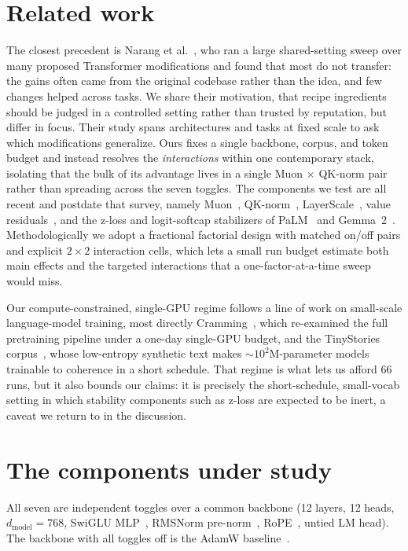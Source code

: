 \documentclass[11pt]{article}
\begin{document}
\section{Related work}

The closest precedent is Narang et al.~\cite{narang2021transfer}, who ran a
large shared-setting sweep over many proposed Transformer modifications and found
that most do not transfer: the gains often came from the original codebase rather
than the idea, and few changes helped across tasks. We share their motivation,
that recipe ingredients should be judged in a controlled setting rather than
trusted by reputation, but differ in focus. Their study spans architectures and
tasks at fixed scale to ask which modifications generalize. Ours fixes a single
backbone, corpus, and token budget and instead resolves the \emph{interactions}
within one contemporary stack, isolating that the bulk of its advantage lives in
a single Muon $\times$ QK-norm pair rather than spreading across the seven
toggles. The components we test are all recent and postdate that survey, namely
Muon~\cite{jordan2024muon}, QK-norm~\cite{henry2020qknorm},
LayerScale~\cite{touvron2021cait}, value residuals~\cite{zhou2024resformer}, and
the z-loss and logit-softcap stabilizers of PaLM~\cite{chowdhery2023palm} and
Gemma~2~\cite{gemma2}. Methodologically we adopt a fractional factorial design with matched
on/off pairs and explicit $2\times2$ interaction cells, which lets a small run
budget estimate both main effects and the targeted interactions that a
one-factor-at-a-time sweep would miss.

Our compute-constrained, single-GPU regime follows a line of work on small-scale
language-model training, most directly Cramming~\cite{geiping2023cramming}, which
re-examined the full pretraining pipeline under a one-day single-GPU budget, and
the TinyStories corpus~\cite{eldan2023tinystories}, whose low-entropy synthetic
text makes ${\sim}10^2$M-parameter models trainable to coherence in a short
schedule. That regime is what lets us afford 66 runs, but it also bounds our
claims: it is precisely the short-schedule, small-vocab setting in which
stability components such as z-loss are expected to be inert, a caveat we return
to in the discussion.

\section{The components under study}

All seven are independent toggles over a common backbone (12 layers, 12 heads,
$d_{\text{model}}=768$, SwiGLU MLP~\cite{shazeer2020glu}, RMSNorm
pre-norm~\cite{zhang2019rmsnorm}, RoPE~\cite{su2024roformer}, untied LM head). The
backbone with all toggles off is the AdamW baseline~\cite{loshchilov2019adamw}.
\end{document}
